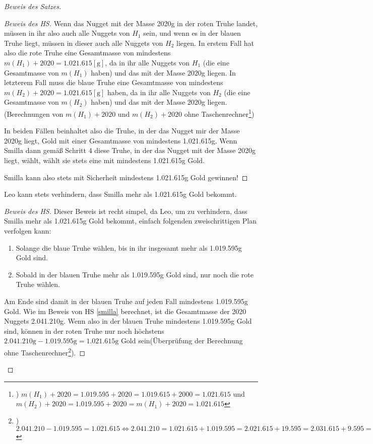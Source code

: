 \begin{proof}[Beweis des Satzes]
\begin{proof}[Beweis des HS]
        Wenn das Nugget mit der Masse 2020g in der roten Truhe landet, müssen in ihr also auch alle Nuggets von $H_1$ 
        sein, und wenn es in der blauen Truhe liegt, müssen in dieser auch alle Nuggets von $H_2$ liegen. In erstem 
        Fall hat also die rote Truhe eine Gesamtmasse von mindestens $m(H_1)+2020=1.021.615 [\text{g}]$, da in ihr 
        alle Nuggets von $H_1$ (die eine Gesamtmasse von $m(H_1)$ haben) und das mit der Masse 2020g liegen. In 
        letzterem Fall muss die blaue Truhe eine Gesamtmasse von mindestens $m(H_2)+2020=1.021.615 [\text{g}]$ haben,
        da in ihr alle Nuggets von $H_2$ (die eine Gesamtmasse von $m(H_2)$ haben) und das mit der Masse 2020g 
        liegen. (Berechnungen von $m(H_1)+2020$ und $m(H_2)+2020$ ohne Taschenrechner\footnote{) $m(H_1)+2020=
        1.019.595+2020=1.019.615+2000=1.021.615$ und $m(H_2)+2020=1.019.595+2020=m(H_1)+2020=1.021.615$})

        In beiden Fällen beinhaltet also die Truhe, in der das Nugget mir der Masse 2020g liegt, Gold mit einer 
        Gesamtmasse von mindestens 1.021.615g. Wenn Smilla dann gemäß Schritt 4 diese Truhe, in der das Nugget mit 
        der Masse 2020g liegt, wählt, wählt sie stets eine mit mindestens 1.021.615g Gold.

        Smilla kann also stets mit Sicherheit mindestens 1.021.615g Gold gewinnen!
    \end{proof}
    \begin{lem}\label{leo}
        Leo kann stets verhindern, dass Smilla mehr als 1.021.615g Gold bekommt.
    \end{lem}
    \begin{proof}[Beweis des HS]
        Dieser Beweis ist recht simpel, da Leo, um zu verhindern, dass Smilla mehr als 1.021.615g Gold bekommt, 
        einfach folgenden zweischrittigen Plan verfolgen kann:
        \begin{enumerate}
            \item Solange die blaue Truhe wählen, bis in ihr insgesamt mehr als 1.019.595g Gold sind.
            \item Sobald in der blauen Truhe mehr als 1.019.595g Gold sind, nur noch die rote Truhe wählen.
        \end{enumerate}
        Am Ende sind damit in der blauen Truhe auf jeden Fall mindestens 1.019.595g Gold. Wie im Beweis von HS 
        \ref{smilla} berechnet, ist die Gesamtmasse der 2020 Nuggets 2.041.210g. Wenn also in der blauen Truhe 
        mindestens 1.019.595g Gold sind, können in der roten Truhe nur noch höchstens $2.041.210\text{g}-1.019.595
        \text{g}=1.021.615\text{g}$ Gold sein(Überprüfung der Berechnung ohne Taschenrechner\footnote{) $2.041.210-
        1.019.595=1.021.615\Leftrightarrow 2.041.210=1.021.615+1.019.595=2.021.615+19.595=2.031.615+9.595=2.040.615
        +595=2.041.115+95=2.041.210$}).


\end{proof}
\end{proof}

